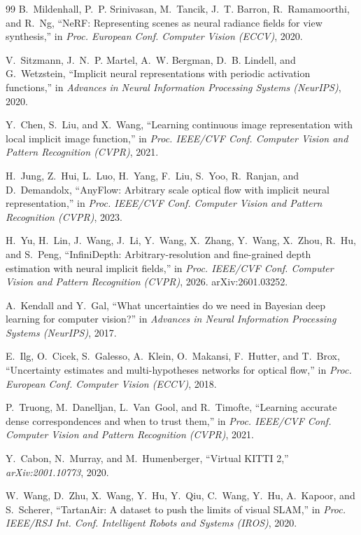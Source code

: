 \documentclass[conference]{IEEEtran}
\begin{document}
\begin{thebibliography}{99}
B.~Mildenhall, P.~P. Srinivasan, M.~Tancik, J.~T. Barron, R.~Ramamoorthi, and
R.~Ng, ``NeRF: Representing scenes as neural radiance fields for view
synthesis,'' in \emph{Proc. European Conf. Computer Vision (ECCV)}, 2020.

V.~Sitzmann, J.~N.~P. Martel, A.~W. Bergman, D.~B. Lindell, and G.~Wetzstein,
``Implicit neural representations with periodic activation functions,'' in
\emph{Advances in Neural Information Processing Systems (NeurIPS)}, 2020.

Y.~Chen, S.~Liu, and X.~Wang, ``Learning continuous image representation with
local implicit image function,'' in \emph{Proc. IEEE/CVF Conf. Computer Vision
and Pattern Recognition (CVPR)}, 2021.

H.~Jung, Z.~Hui, L.~Luo, H.~Yang, F.~Liu, S.~Yoo, R.~Ranjan, and D.~Demandolx,
``AnyFlow: Arbitrary scale optical flow with implicit neural representation,'' in
\emph{Proc. IEEE/CVF Conf. Computer Vision and Pattern Recognition (CVPR)}, 2023.

H.~Yu, H.~Lin, J.~Wang, J.~Li, Y.~Wang, X.~Zhang, Y.~Wang, X.~Zhou, R.~Hu, and
S.~Peng, ``InfiniDepth: Arbitrary-resolution and fine-grained depth estimation
with neural implicit fields,'' in \emph{Proc. IEEE/CVF Conf. Computer Vision and
Pattern Recognition (CVPR)}, 2026. arXiv:2601.03252.

A.~Kendall and Y.~Gal, ``What uncertainties do we need in Bayesian deep learning
for computer vision?'' in \emph{Advances in Neural Information Processing Systems
(NeurIPS)}, 2017.

E.~Ilg, O.~Cicek, S.~Galesso, A.~Klein, O.~Makansi, F.~Hutter, and T.~Brox,
``Uncertainty estimates and multi-hypotheses networks for optical flow,'' in
\emph{Proc. European Conf. Computer Vision (ECCV)}, 2018.

P.~Truong, M.~Danelljan, L.~Van~Gool, and R.~Timofte, ``Learning accurate dense
correspondences and when to trust them,'' in \emph{Proc. IEEE/CVF Conf. Computer
Vision and Pattern Recognition (CVPR)}, 2021.

Y.~Cabon, N.~Murray, and M.~Humenberger, ``Virtual KITTI 2,''
\emph{arXiv:2001.10773}, 2020.

W.~Wang, D.~Zhu, X.~Wang, Y.~Hu, Y.~Qiu, C.~Wang, Y.~Hu, A.~Kapoor, and
S.~Scherer, ``TartanAir: A dataset to push the limits of visual SLAM,'' in
\emph{Proc. IEEE/RSJ Int. Conf. Intelligent Robots and Systems (IROS)}, 2020.

\end{thebibliography}
\end{document}
